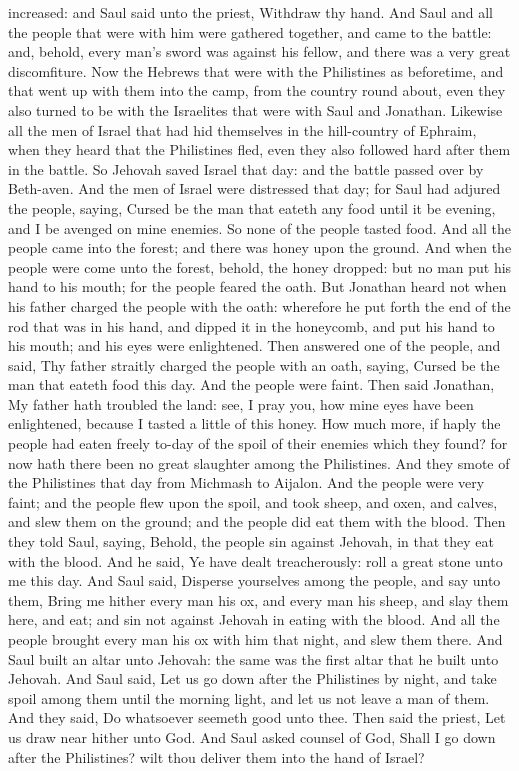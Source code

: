 increased: and Saul said unto the priest, Withdraw thy hand. And Saul and all the people that were with him were gathered together, and came to the battle: and, behold, every man’s sword was against his fellow, and there was a very great discomfiture. Now the Hebrews that were with the Philistines as beforetime, and that went up with them into the camp, from the country round about, even they also turned to be with the Israelites that were with Saul and Jonathan. Likewise all the men of Israel that had hid themselves in the hill-country of Ephraim, when they heard that the Philistines fled, even they also followed hard after them in the battle. So Jehovah saved Israel that day: and the battle passed over by Beth-aven.  And the men of Israel were distressed that day; for Saul had adjured the people, saying, Cursed be the man that eateth any food until it be evening, and I be avenged on mine enemies. So none of the people tasted food. And all the people came into the forest; and there was honey upon the ground. And when the people were come unto the forest, behold, the honey dropped: but no man put his hand to his mouth; for the people feared the oath. But Jonathan heard not when his father charged the people with the oath: wherefore he put forth the end of the rod that was in his hand, and dipped it in the honeycomb, and put his hand to his mouth; and his eyes were enlightened. Then answered one of the people, and said, Thy father straitly charged the people with an oath, saying, Cursed be the man that eateth food this day. And the people were faint. Then said Jonathan, My father hath troubled the land: see, I pray you, how mine eyes have been enlightened, because I tasted a little of this honey. How much more, if haply the people had eaten freely to-day of the spoil of their enemies which they found? for now hath there been no great slaughter among the Philistines.  And they smote of the Philistines that day from Michmash to Aijalon. And the people were very faint; and the people flew upon the spoil, and took sheep, and oxen, and calves, and slew them on the ground; and the people did eat them with the blood. Then they told Saul, saying, Behold, the people sin against Jehovah, in that they eat with the blood. And he said, Ye have dealt treacherously: roll a great stone unto me this day. And Saul said, Disperse yourselves among the people, and say unto them, Bring me hither every man his ox, and every man his sheep, and slay them here, and eat; and sin not against Jehovah in eating with the blood. And all the people brought every man his ox with him that night, and slew them there. And Saul built an altar unto Jehovah: the same was the first altar that he built unto Jehovah.  And Saul said, Let us go down after the Philistines by night, and take spoil among them until the morning light, and let us not leave a man of them. And they said, Do whatsoever seemeth good unto thee. Then said the priest, Let us draw near hither unto God. And Saul asked counsel of God, Shall I go down after the Philistines? wilt thou deliver them into the hand of Israel? 